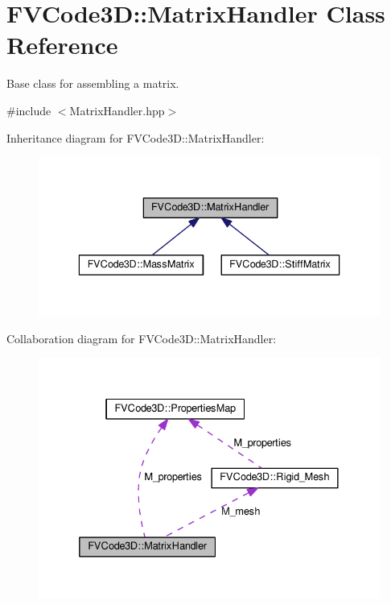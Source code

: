 \hypertarget{classFVCode3D_1_1MatrixHandler}{}\section{F\+V\+Code3D\+:\+:Matrix\+Handler Class Reference}
\label{classFVCode3D_1_1MatrixHandler}


Base class for assembling a matrix.  




{\ttfamily \#include $<$Matrix\+Handler.\+hpp$>$}



Inheritance diagram for F\+V\+Code3D\+:\+:Matrix\+Handler\+:
\nopagebreak
\begin{figure}[H]
\begin{center}
\leavevmode
\includegraphics[width=336pt]{classFVCode3D_1_1MatrixHandler__inherit__graph}
\end{center}
\end{figure}


Collaboration diagram for F\+V\+Code3D\+:\+:Matrix\+Handler\+:
\nopagebreak
\begin{figure}[H]
\begin{center}
\leavevmode
\includegraphics[width=332pt]{classFVCode3D_1_1MatrixHandler__coll__graph}
\end{center}
\end{figure}
